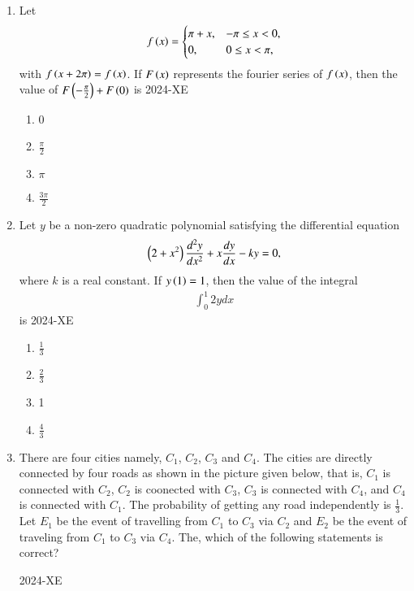 \documentclass[journal,12pt,onecolumn]{IEEEtran}
\theoremstyle{remark}
\begin{document}
\begin{enumerate}

\item Let 
	\begin{align*}
		f\left(x\right)= \begin{cases}
			 	\pi + x, & -\pi \leq x < 0, \\
				0, & 0 \leq x < \pi,
		\end{cases}
	\end{align*}
with $f\left(x + 2\pi\right)=f\left(x\right)$. If $F\left(x\right)$ represents the fourier series of $f\left(x\right)$, then the value of $F\left(-\frac{\pi}{2}\right)+F\left(0\right)$ is
\hfill{2024-XE}

		\begin{enumerate}
			\item 0
			\item $\frac{\pi}{2}$
			\item $\pi$
			\item $\frac{3\pi}{2}$
		\end{enumerate}

\item Let $y$ be a non-zero quadratic polynomial satisfying the differential equation 
	\begin{align*}
		\left(2+x^2\right)\frac{d^2y}{dx^2}+x\frac{dy}{dx}-ky=0,
	\end{align*}
		where $k$ is a real constant. If $y\left(1\right)=1$, then the value of the integral
		\begin{align*}
			\int_0 ^1 2y dx
		\end{align*}
		is
\hfill{2024-XE}

		\begin{enumerate}
			\item $\frac{1}{3}$
			\item $\frac{2}{3}$
			\item 1
			\item $\frac{4}{3}$
		\end{enumerate}

\item There are four cities namely, $C_1$, $C_2$, $C_3$ and $C_4$. The cities are directly connected by four roads as shown in the picture given below, that is, $C_1$ is connected with $C_2$, $C_2$ is coonected with $C_3$, $C_3$ is connected with $C_4$, and $C_4$ is connected with $C_1$. The probability of getting any road independently is $\frac{1}{3}$. Let $E_1$ be the event of travelling from $C_1$ to $C_3$ via $C_2$ and $E_2$ be the event of traveling from $C_1$ to $C_3$ via $C_4$. The, which of the following statements is correct?
	\begin{figure}[ht]
		\centering
		
	\end{figure}
\hfill{2024-XE}


\end{enumerate}
\end{document}
